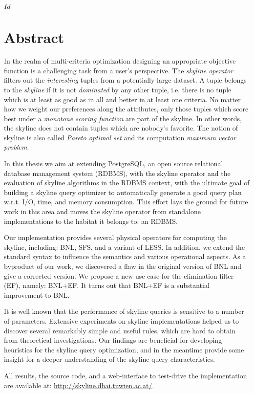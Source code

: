 
\svnInfo $Id$


\chapter*{Abstract\revision}


In the realm of multi-criteria optimization designing an appropriate
objective function is a challenging task from a user's perspective.
%
The \emph{skyline operator} filters out the \emph{interesting} tuples
from a potentially large dataset.  A tuple belongs to the \emph{skyline} if
it is not \emph{dominated} by any other tuple, i.e. there is no tuple
which is at least as good as in all and better in at least one criteria.
%
No matter how we weight our preferences along the attributes, only
those tuples which score best under a \emph{monotone scoring function} are
part of the skyline.
%
In other words, the skyline does not contain tuples which
are nobody's favorite.
%
The notion of skyline is also called \emph{Pareto optimal set} and its
computation \emph{maximum vector problem}.


In this thesis we aim at extending PostgreSQL, an open source
relational database management system (RDBMS), with the skyline
operator and the evaluation of skyline algorithms in the RDBMS
context, with the ultimate goal of building a skyline query optimizer
to automatically generate a good query plan w.r.t. I/O, time, and
memory consumption.
%
This effort lays the ground for future work in this area and moves the
skyline operator from standalone implementations to the habitat it
belongs to: an RDBMS.


Our implementation provides several physical operators for computing
the skyline, including: BNL, SFS, and a variant of LESS.
%
In addition, we extend the standard syntax to influence the
semantics and various operational aspects.
%
As a byproduct of our work, we discovered a flaw in the original
version of BNL and give a corrected version.
%
We propose a new use case for the elimination filter (EF), namely:
BNL+EF. It turns out that BNL+EF is a substantial improvement to BNL.

It is well known that the performance of skyline queries is sensitive
to a number of parameters.  
%
Extensive experiments on skyline implementations helped us to discover
several remarkably simple and useful rules, which are hard to obtain
from theoretical investigations.
%
Our findings are beneficial for developing heuristics for the skyline
query optimization, and in the meantime provide some insight for a
deeper understanding of the skyline query characteristics.

All results, the source code, and a web-interface to test-drive the
implementation are available at:
\url{http://skyline.dbai.tuwien.ac.at/}.
